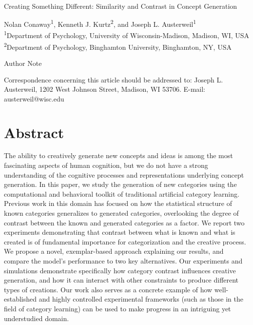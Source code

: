 \documentclass[12pt]{article}
\begin{document}
\begin{center}
\hfill
\\[1in]

Creating Something Different: Similarity and Contrast in Concept Generation


\vfill

Nolan Conaway\textsuperscript{1}, 
Kenneth J. Kurtz\textsuperscript{2}, 
and Joseph L. Austerweil\textsuperscript{1}
\\[\baselineskip]
\textsuperscript{1}Department of Psychology, University of Wisconsin-Madison, Madison, WI, USA
\textsuperscript{2}Department of Psychology, Binghamton University, Binghamton, NY, USA
\\[1in]

\vfill

Author Note

Correspondence concerning this article should be addressed to: 
Joseph L. Austerweil, 1202 West Johnson Street, Madison, WI 53706.
E-mail: austerweil@wisc.edu

\end{center}
\clearpage


\doublespacing
\section*{Abstract}

The ability to creatively generate new concepts and ideas is among the most fascinating aspects of human cognition, but we do not have a strong understanding of the cognitive processes and representations underlying concept generation. In this paper, we study the generation of new categories using the computational and behavioral toolkit of traditional artificial category learning. Previous work in this domain has focused on how the statistical structure of known categories generalizes to generated categories, overlooking the degree of contrast between the known and generated categories as a factor. We report two experiments demonstrating that contrast between what is known and what is created is of fundamental importance for categorization and the creative process. We propose a novel, exemplar-based approach explaining our results, and compare the model's performance to two key alternatives. Our experiments and simulations demonstrate specifically how category contrast influences creative generation, and how it can interact with other constraints to produce different types of creations. Our work also serves as a concrete example of how well-established and highly controlled experimental frameworks (such as those in the field of category learning) can be used to make progress in an intriguing yet understudied domain.
\end{document}
